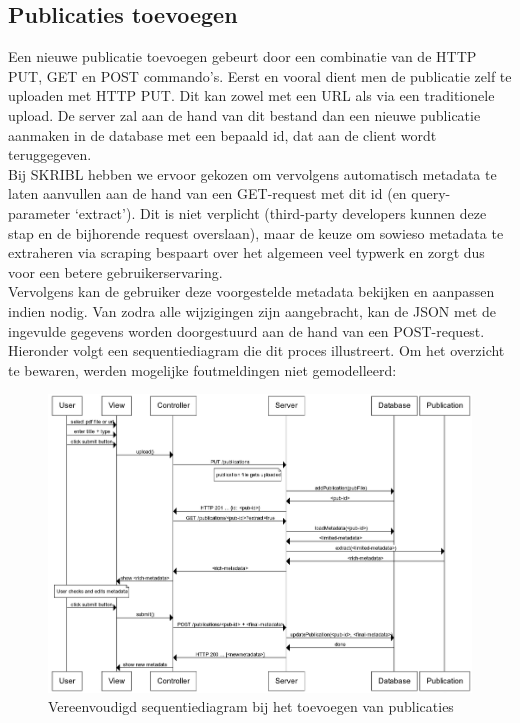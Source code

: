 \documentclass{article}
\begin{document}
\subsection{Publicaties toevoegen}

Een nieuwe publicatie toevoegen gebeurt door een combinatie van de HTTP PUT, GET en POST commando's. Eerst en vooral dient men de publicatie zelf te uploaden met HTTP PUT. Dit kan zowel met een URL als via een traditionele upload. De server zal aan de hand van dit bestand dan een nieuwe publicatie aanmaken in de database met een bepaald id, dat aan de client wordt teruggegeven. \\

Bij SKRIBL hebben we ervoor gekozen om vervolgens automatisch metadata te laten aanvullen aan de hand van een GET-request met dit id (en query-parameter `extract'). Dit is niet verplicht (third-party developers kunnen deze stap en de bijhorende request overslaan), maar de keuze om sowieso metadata te extraheren via scraping bespaart over het algemeen veel typwerk en zorgt dus voor een betere gebruikerservaring. \\

Vervolgens kan de gebruiker deze voorgestelde metadata bekijken en aanpassen indien nodig. Van zodra alle wijzigingen zijn aangebracht, kan de JSON met de ingevulde gegevens worden doorgestuurd aan de hand van een POST-request. \\

Hieronder volgt een sequentiediagram die dit proces illustreert. Om het overzicht te bewaren, werden mogelijke foutmeldingen niet gemodelleerd:

\begin{figure}[!h]
\centering
 \includegraphics[width=165mm]{upload-sequence.png}
 \caption{Vereenvoudigd sequentiediagram bij het toevoegen van publicaties}
 \label{upload-sequence}
\end{figure}
\end{document}
